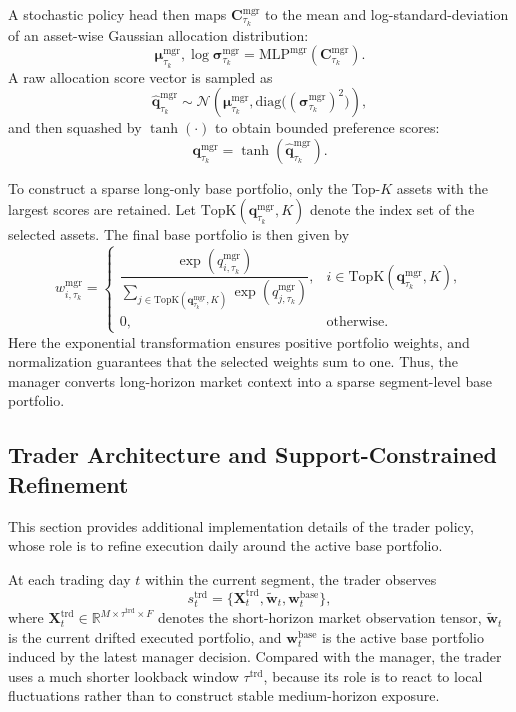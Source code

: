 \documentclass[letterpaper]{article} %
\begin{document}
A stochastic policy head then maps \(\mathbf{C}^{\mathrm{mgr}}_{\tau_k}\) to the mean and log-standard-deviation of an asset-wise Gaussian allocation distribution:
\[
\boldsymbol{\mu}^{\mathrm{mgr}}_{\tau_k},
\log \boldsymbol{\sigma}^{\mathrm{mgr}}_{\tau_k}
=
\mathrm{MLP}^{\mathrm{mgr}}\!\left(\mathbf{C}^{\mathrm{mgr}}_{\tau_k}\right).
\]
A raw allocation score vector is sampled as
\[
\hat{\mathbf{q}}^{\mathrm{mgr}}_{\tau_k}
\sim
\mathcal{N}\!\left(
\boldsymbol{\mu}^{\mathrm{mgr}}_{\tau_k},
\mathrm{diag}\bigl((\boldsymbol{\sigma}^{\mathrm{mgr}}_{\tau_k})^2\bigr)
\right),
\]
and then squashed by \(\tanh(\cdot)\) to obtain bounded preference scores:
\[
\mathbf{q}^{\mathrm{mgr}}_{\tau_k}
=
\tanh\!\left(\hat{\mathbf{q}}^{\mathrm{mgr}}_{\tau_k}\right).
\]

To construct a sparse long-only base portfolio, only the Top-\(K\) assets with the largest scores are retained. Let \(\mathrm{TopK}(\mathbf{q}^{\mathrm{mgr}}_{\tau_k},K)\) denote the index set of the selected assets. The final base portfolio is then given by
\[
w_{i,\tau_k}^{\mathrm{mgr}}
=
\begin{cases}
\dfrac{\exp(q_{i,\tau_k}^{\mathrm{mgr}})}
{\sum_{j\in\mathrm{TopK}(\mathbf{q}^{\mathrm{mgr}}_{\tau_k},K)}
\exp(q_{j,\tau_k}^{\mathrm{mgr}})},
& i\in\mathrm{TopK}(\mathbf{q}^{\mathrm{mgr}}_{\tau_k},K),\\[10pt]
0, & \text{otherwise}.
\end{cases}
\]
Here the exponential transformation ensures positive portfolio weights, and normalization guarantees that the selected weights sum to one. Thus, the manager converts long-horizon market context into a sparse segment-level base portfolio.

\subsection{Trader Architecture and Support-Constrained Refinement}
\label{app:hier_trader}

This section provides additional implementation details of the trader policy, whose role is to refine execution daily around the active base portfolio.

At each trading day \(t\) within the current segment, the trader observes
\[
s_t^{\mathrm{trd}}
=
\bigl\{\mathbf{X}^{\mathrm{trd}}_t,\tilde{\mathbf{w}}_t,\mathbf{w}^{\mathrm{base}}_t\bigr\},
\]
where \(\mathbf{X}^{\mathrm{trd}}_t\in\mathbb{R}^{M\times \tau^{\mathrm{trd}}\times F}\) denotes the short-horizon market observation tensor, \(\tilde{\mathbf{w}}_t\) is the current drifted executed portfolio, and \(\mathbf{w}^{\mathrm{base}}_t\) is the active base portfolio induced by the latest manager decision. Compared with the manager, the trader uses a much shorter lookback window \(\tau^{\mathrm{trd}}\), because its role is to react to local fluctuations rather than to construct stable medium-horizon exposure.
\end{document}

